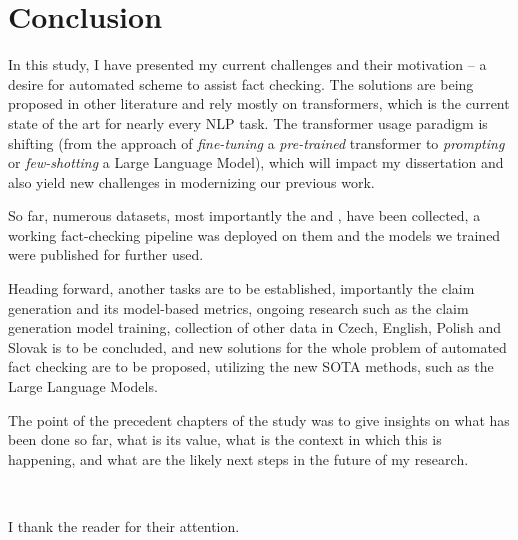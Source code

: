 
\chapter{Conclusion}
\label{chap:conclusion}
In this study, I have presented my current challenges and their motivation -- a desire for automated scheme to assist fact checking.
The solutions are being proposed in other literature and rely mostly on transformers, which is the current state of the art for nearly every NLP task.
The transformer usage paradigm is shifting (from the approach of \textit{fine-tuning} a \textit{pre-trained} transformer to \textit{prompting} or \textit{few-shotting} a Large Language Model), which will impact my dissertation and also yield new challenges in modernizing our previous work.

So far, numerous datasets, most importantly the \FCZ and \CTK, have been collected, a working fact-checking pipeline was deployed on them and the models we trained were published for further used.

Heading forward, another tasks are to be established, importantly the claim generation and its model-based metrics, ongoing research such as the claim generation model training, collection of other data in Czech, English, Polish and Slovak is to be concluded, and new solutions for the whole problem of automated fact checking are to be proposed, utilizing the new SOTA methods, such as the Large Language Models.

The point of the precedent chapters of the study was to give insights on what has been done so far, what is its value, what is the context in which this is happening, and what are the likely next steps in the future of my research.

~

I thank the reader for their attention.

